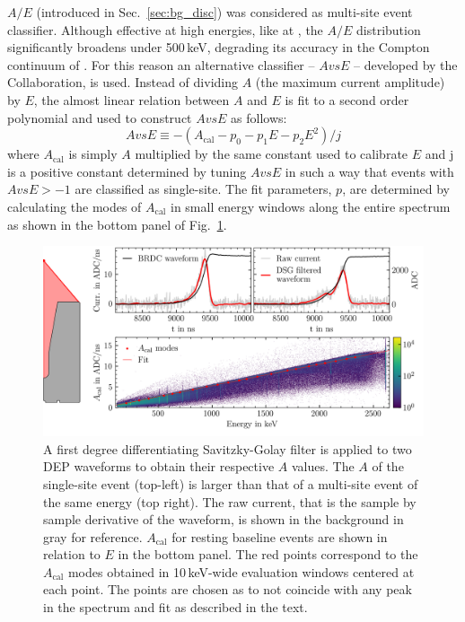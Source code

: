 $A/E$ (introduced in Sec.~\ref{sec:bg_disc}) was considered as multi-site event classifier. Although effective at high energies, like at \Qbb{}, the $A/E$ distribution significantly broadens under 500\,keV, degrading its accuracy in the Compton continuum of \CsS{}. For this reason an alternative classifier -- $AvsE$ -- developed by the {\MJMit} Collaboration, is used. Instead of dividing $A$ (the maximum current amplitude) by $E$, the almost linear relation between $A$ and $E$ is fit to a second order polynomial and used to construct $AvsE$ as follows: 
\begin{equation}
	AvsE \equiv -(A_\text{cal} - p_0 - p_1E - p_2E^2)/j
	\label{eq:avse}
\end{equation}
where $A_\text{cal}$ is simply $A$ multiplied by the same constant used to calibrate $E$ and j is a positive constant determined by tuning $AvsE$ in such a way that events with $AvsE > -1$ are classified as single-site. The fit parameters, $p$, are determined by calculating the modes of $A_\text{cal}$ in small energy windows along the entire \ThS{} spectrum as shown in the bottom panel of Fig.~\ref{fig:avse_calculation}.
\begin{figure}[htb]
    \centering
    \includegraphics[width=6in]{figs/param/avse_calculation.png}
    \caption{A first degree differentiating Savitzky-Golay filter is applied to two DEP waveforms to obtain their respective $A$ values. The $A$ of the single-site event (top-left) is larger than that of a multi-site event of the same energy (top right). The raw current, that is the sample by sample derivative of the waveform, is shown in the background in gray for reference. $A_\text{cal}$ for resting baseline events are shown in relation to  $E$ in the bottom panel. The red points correspond to the $A_\text{cal}$ modes obtained in 10\,keV-wide evaluation windows centered at each point. The points are chosen as to not coincide with any peak in the spectrum and fit as described in the text.}
    \label{fig:avse_calculation}
\end{figure}

